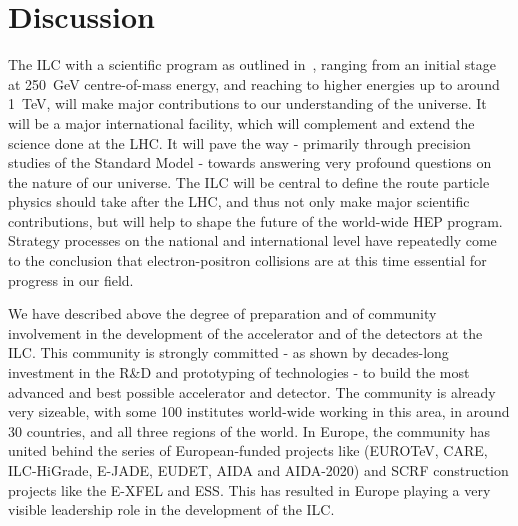 \documentclass[%
 reprint,
 floatfix,
 amsmath,amssymb,
 aps,
]{revtex4-1}
\begin{document}
\section{\label{sec:discussion}Discussion}
The ILC with a scientific program as outlined in~\cite{ILCESU1}, ranging from 
an initial stage at 250~GeV centre-of-mass energy, and reaching to higher 
energies up to around 1~TeV, will make major contributions to our understanding of the universe. It will be a major international facility, which will 
complement and extend the science done at the LHC. It will pave the way - 
primarily through precision studies of the Standard Model - towards answering 
very profound questions on the nature of our universe. The ILC will be central to 
define the route particle physics should take after the LHC, and thus not only 
make major scientific contributions, but will help to shape the future of the 
world-wide HEP program. Strategy processes on the national and 
international level have repeatedly come to the conclusion that electron-positron collisions 
are at this time essential for progress in our field. 


We have described above the degree of preparation and of community involvement 
in the development of the accelerator and of the detectors at the ILC. This 
community is strongly committed - as shown by decades-long investment in the 
R\&D and prototyping of technologies - to build the most advanced and best 
possible accelerator and detector. The community is already very sizeable, with 
some 100 institutes world-wide working in this area, in around 30 countries, and 
all three regions of the world. In Europe, the community has united behind the 
series of  European-funded projects like (EUROTeV, CARE, ILC-HiGrade, E-JADE, EUDET, AIDA and AIDA-2020) and SCRF construction projects like the E-XFEL and ESS. This has 
resulted in Europe playing a very visible leadership role in the development of the ILC.



\end{document}
